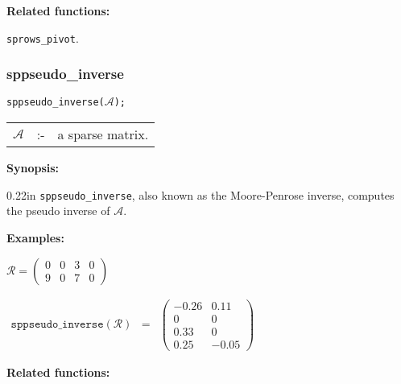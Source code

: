 \textbf{Related functions:}

\hspace*{0.175in} \texttt{sprows\_pivot}.


\subsubsection{sppseudo\_inverse}

\hspace*{0.175in} \texttt{sppseudo\_inverse($\mathcal{A}$);}

\hspace*{0.1in}  
\begin{tabular}{l l l} 
$\mathcal{A}$ &:-& a sparse matrix.
\end{tabular}

\textbf{Synopsis:} 

\begin{addtolength}{\leftskip}{0.22in}
\texttt{sppseudo\_inverse}, also known as the Moore-Penrose inverse, computes
the pseudo inverse of $\mathcal{A}$. 

\end{addtolength}

\textbf{Examples:}

\begin{flushleft}
\hspace*{0.175in}
\begin{math}  
\mathcal{R} = \left( \begin{array}{cccc} 0 & 0 & 3 & 0 \\ 9 & 0 & 7 & 0
\end{array} \right)
\end{math}  
\end{flushleft}

\begin{flushleft}  
\hspace*{0.1in}
\begin{math}  
\begin{array}{ccc}
\texttt{sppseudo\_inverse}(\mathcal{R}) & = & 
        \left( \begin{array}{cc} -0.26 & 0.11 \\ 0 & 0 \\ 0.33 & 0 
\\ 0.25 & -0.05 
 \end{array} \right) 
\end{array}
\end{math}  
\end{flushleft}

\textbf{Related functions:}

